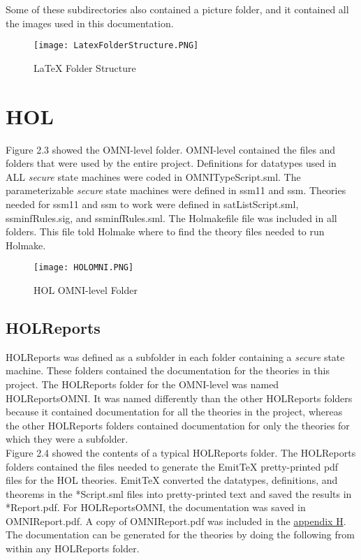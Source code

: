 Some of these subdirectories also contained a picture folder, and it contained all the images used in this documentation. 
\begin{figure}[h]
  \centering
  \texttt{[image: LatexFolderStructure.PNG]}
  \caption{LaTeX Folder Structure}
\end{figure}

\section{HOL}
\label{sec:hol}

Figure 2.3  showed the OMNI-level folder.  OMNI-level contained the files and folders that were used by the entire project. Definitions for datatypes used in ALL \emph{secure} state machines were coded in OMNITypeScript.sml.  The parameterizable \emph{secure} state machines were defined in ssm11 and ssm.  Theories needed for ssm11 and ssm to work were defined in satListScript.sml, ssminfRules.sig, and ssminfRules.sml.  The Holmakefile file was included in all folders.  This file told Holmake where to find the theory files needed to run Holmake. 

\begin{figure}[h]
  \centering
  \texttt{[image: HOLOMNI.PNG]}
  \caption{HOL OMNI-level Folder}
\end{figure}

\subsection{HOLReports}
\label{sec:holreports}

HOLReports was defined as a subfolder in each folder containing a \emph{secure} state machine. These folders contained the documentation for the theories in this project.  The HOLReports folder for the OMNI-level was named HOLReportsOMNI.  It was named differently than the other HOLReports folders because it contained documentation for all the theories in the project, whereas the other HOLReports folders contained documentation for only the theories for which they were a subfolder.\\

Figure 2.4  showed the contents of a typical HOLReports folder. The HOLReports folders contained the files needed to generate the EmitTeX pretty-printed pdf files for the HOL theories.  EmitTeX converted the datatypes, definitions, and theorems in the *Script.sml files into pretty-printed text and saved the results in *Report.pdf.  For HOLReportsOMNI, the documentation was saved in OMNIReport.pdf.  A copy of OMNIReport.pdf was included in the \hyperlink{OMNIReport}{appendix H}.  The documentation can be generated for the theories by doing the following from within any HOLReports folder. 


